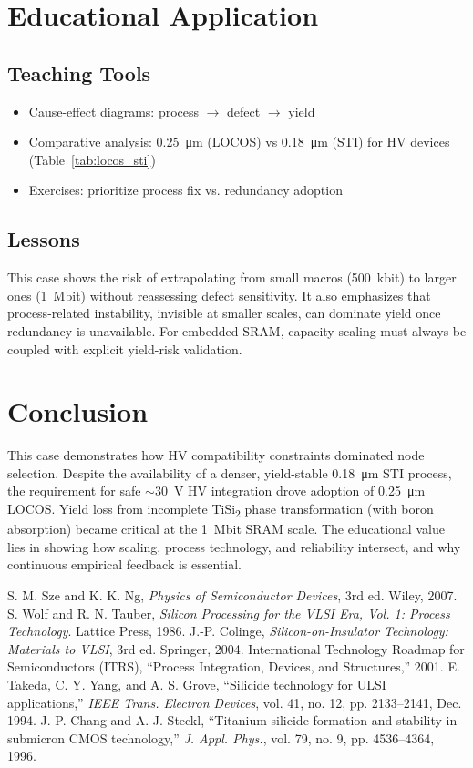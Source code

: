 \documentclass[conference]{IEEEtran}
\begin{document}
\section{Educational Application}
\subsection{Teaching Tools}
\begin{itemize}
    \item Cause-effect diagrams: process $\rightarrow$ defect $\rightarrow$ yield
    \item Comparative analysis: \SI{0.25}{\micro\meter} (LOCOS) vs \SI{0.18}{\micro\meter} (STI) for HV devices (Table~\ref{tab:locos_sti})
    \item Exercises: prioritize process fix vs. redundancy adoption
\end{itemize}

\subsection{Lessons}
This case shows the risk of extrapolating from small macros (500~kbit) to larger ones (\SI{1}{Mbit}) without reassessing defect sensitivity.  
It also emphasizes that process-related instability, invisible at smaller scales, can dominate yield once redundancy is unavailable.  
For embedded SRAM, capacity scaling must always be coupled with explicit yield-risk validation.

\section{Conclusion}
This case demonstrates how HV compatibility constraints dominated node selection.  
Despite the availability of a denser, yield-stable \SI{0.18}{\micro\meter} STI process, the requirement for safe $\sim$\SI{30}{\volt} HV integration drove adoption of \SI{0.25}{\micro\meter} LOCOS.  
Yield loss from incomplete TiSi\textsubscript{2} phase transformation (with boron absorption) became critical at the \SI{1}{Mbit} SRAM scale.  
The educational value lies in showing how scaling, process technology, and reliability intersect, and why continuous empirical feedback is essential.

\begin{thebibliography}{99}
 S. M. Sze and K. K. Ng, \textit{Physics of Semiconductor Devices}, 3rd ed. Wiley, 2007.
 S. Wolf and R. N. Tauber, \textit{Silicon Processing for the VLSI Era, Vol. 1: Process Technology}. Lattice Press, 1986.
 J.-P. Colinge, \textit{Silicon-on-Insulator Technology: Materials to VLSI}, 3rd ed. Springer, 2004.
 International Technology Roadmap for Semiconductors (ITRS), ``Process Integration, Devices, and Structures,'' 2001.
 E. Takeda, C. Y. Yang, and A. S. Grove, ``Silicide technology for ULSI applications,'' \textit{IEEE Trans. Electron Devices}, vol. 41, no. 12, pp. 2133--2141, Dec. 1994.
 J. P. Chang and A. J. Steckl, ``Titanium silicide formation and stability in submicron CMOS technology,'' \textit{J. Appl. Phys.}, vol. 79, no. 9, pp. 4536--4364, 1996.
\end{thebibliography}
\end{document}
